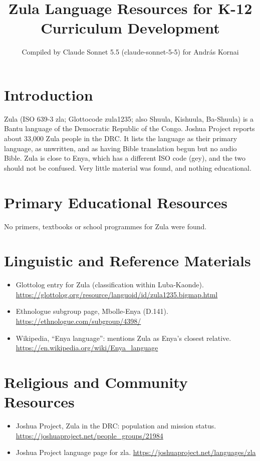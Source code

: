 \documentclass[12pt]{article}
\title{Zula Language Resources for K-12 Curriculum Development}
\author{Compiled by Claude Sonnet 5.5 (claude-sonnet-5-5) for Andr\'as Kornai}
\date{}
\begin{document}
\maketitle

\section{Introduction}
Zula (ISO 639-3 zla; Glottocode zula1235; also Shuula, Kishuula, Ba-Shuula) is a Bantu language of the Democratic Republic of the Congo. Joshua Project reports about 33,000 Zula people in the DRC. It lists the language as their primary language, as unwritten, and as having Bible translation begun but no audio Bible. Zula is close to Enya, which has a different ISO code (gey), and the two should not be confused. Very little material was found, and nothing educational.

\section{Primary Educational Resources}
No primers, textbooks or school programmes for Zula were found.

\section{Linguistic and Reference Materials}
\begin{itemize}
\item Glottolog entry for Zula (classification within Luba-Kaonde). \url{https://glottolog.org/resource/languoid/id/zula1235.bigmap.html}
\item Ethnologue subgroup page, Mbolle-Enya (D.141). \url{https://ethnologue.com/subgroup/4398/}
\item Wikipedia, ``Enya language'': mentions Zula as Enya's closest relative. \url{https://en.wikipedia.org/wiki/Enya_language}
\end{itemize}

\section{Religious and Community Resources}
\begin{itemize}
\item Joshua Project, Zula in the DRC: population and mission status. \url{https://joshuaproject.net/people_groups/21984}
\item Joshua Project language page for zla. \url{https://joshuaproject.net/languages/zla}
\end{itemize}
\end{document}
